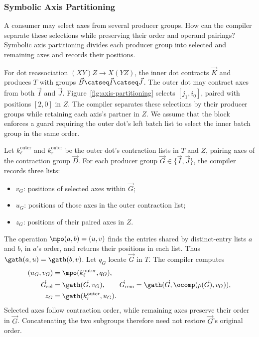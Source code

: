 \subsubsection{Symbolic Axis Partitioning}
\label{sec:partitioning}
A consumer may select axes from several producer groups. How can the
compiler separate these selections while preserving their order and operand
pairings? Symbolic axis partitioning divides each producer group into
selected and remaining axes and records their positions.

For dot reassociation $(XY)Z\to X(YZ)$, the inner dot contracts $\vec K$ and
produces $T$ with groups $\vec B\catseq\vec I\catseq\vec J$. The outer dot may contract
axes from both $\vec I$ and $\vec J$. Figure~\ref{fig:axis-partitioning} selects
$[j_1,i_0]$, paired with positions $[2,0]$ in $Z$. The compiler separates
these selections by their producer groups while retaining each axis's
partner in $Z$. We assume that the  block enforces a guard
requiring the outer dot's left batch list to select the inner batch group
in the same order.

Let $k_\ell^{\mathrm{outer}}$ and $k_r^{\mathrm{outer}}$ be the outer dot's
contraction lists in $T$ and $Z$, pairing axes of the contraction group $\vec D$.
For each producer group $\vec G\in\{\vec I,\vec J\}$, the compiler records three lists:
\begin{itemize}
\item $v_G$: positions of selected axes within $\vec G$;
\item $u_G$: positions of those axes in the outer contraction list;
\item $z_G$: positions of their paired axes in $Z$.
\end{itemize}
The operation $\mpo(a,b)=(u,v)$ finds the entries shared by
distinct-entry lists $a$ and $b$, in $a$'s order, and returns their positions
in each list. Thus $\gath(a,u)=\gath(b,v)$.
Let $q_G$ locate $\vec G$ in $T$. The compiler computes
\begin{equation}
\begin{aligned}
 (u_G,v_G)&=\mpo(k_\ell^{\mathrm{outer}},q_G),\\
 \vec G_{\mathrm{sel}}&=\gath(\vec G,v_G),\qquad
 \vec G_{\mathrm{rem}}=\gath(\vec G,\ocomp(\rho(\vec G),v_G)),\\
 z_G&=\gath(k_r^{\mathrm{outer}},u_G).
\end{aligned}
\label{eq:z-partners}
\end{equation}
Selected axes follow contraction order, while remaining axes preserve
their order in $\vec G$. Concatenating the two subgroups therefore need not
restore $\vec G$'s original order.

